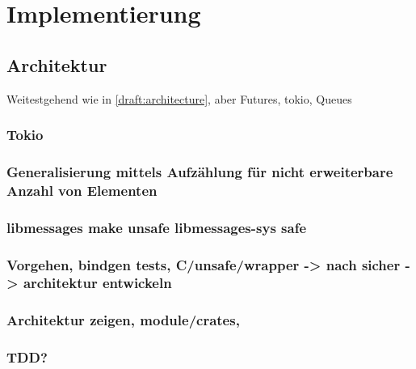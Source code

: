 
\chapter{Implementierung}

\section{Architektur}

Weitestgehend wie in \autoref{draft:architecture}, aber Futures, tokio, Queues





\subsection{Tokio}

	\subsection{Generalisierung mittels Aufzählung für nicht erweiterbare Anzahl von Elementen}
	
	\subsection{libmessages make unsafe libmessages-sys safe}
	
	\subsection{Vorgehen, bindgen tests, C/unsafe/wrapper -> nach sicher ->  architektur entwickeln}
	
	\subsection{Architektur zeigen, module/crates, }

	\subsection{TDD?}
	
